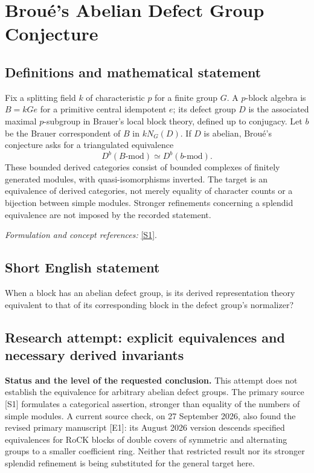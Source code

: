 \documentclass[11pt]{article}
\begin{document}
\section*{\texorpdfstring{Broué's Abelian Defect Group Conjecture}{Broué's Abelian Defect Group Conjecture}}\label{30002013}
\subsection{Definitions and mathematical statement}
Fix a splitting field $k$ of characteristic $p$ for a finite group $G$. A $p$-block algebra is $B=kGe$ for a primitive central idempotent $e$; its defect group $D$ is the associated maximal $p$-subgroup in Brauer's local block theory, defined up to conjugacy. Let $b$ be the Brauer correspondent of $B$ in $kN_G(D)$. If $D$ is abelian, Brou\'e's conjecture asks for a triangulated equivalence
\[
 D^b(B\text{-}\mathrm{mod})\simeq D^b(b\text{-}\mathrm{mod}).
\]
These bounded derived categories consist of bounded complexes of finitely generated modules, with quasi-isomorphisms inverted. The target is an equivalence of derived categories, not merely equality of character counts or a bijection between simple modules. Stronger refinements concerning a splendid equivalence are not imposed by the recorded statement.
\par\smallskip\textit{Formulation and concept references:} \href{http://www.numdam.org/item/AST_1990__181-182__61_0/}{[S1]}.

\subsection{Short English statement}
When a block has an abelian defect group, is its derived representation theory equivalent to that of its corresponding block in the defect group's normalizer?
\subsection{Research attempt: explicit equivalences and necessary derived invariants}
\textbf{Status and the level of the requested conclusion.} This attempt does not establish the equivalence for arbitrary abelian defect groups. The primary source [S1] formulates a categorical assertion, stronger than equality of the numbers of simple modules. A current source check, on 27 September 2026, also found the revised primary manuscript [E1]: its August 2026 version descends specified equivalences for RoCK blocks of double covers of symmetric and alternating groups to a smaller coefficient ring. Neither that restricted result nor its stronger splendid refinement is being substituted for the general target here.
\end{document}
